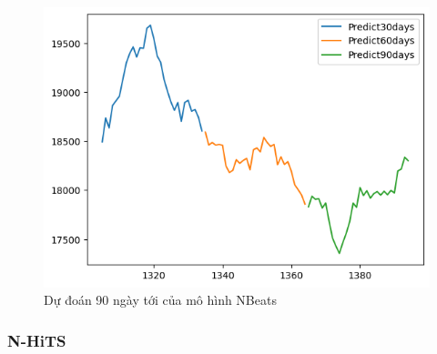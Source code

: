 \begin{figure}[H]
\begin{minipage}{0.15\textwidth}
    \includegraphics[width=1\textwidth]{resources/chapter-5/newdata1/predicted/EIB_NBeats_9-1_30days.png}
    \end{minipage}
    \hfill
    
    \caption{Dự đoán 90 ngày tới của mô hình NBeats}
    \label{fig:NBeats_predicted}
\end{figure}

\subsubsection{N-HiTS}